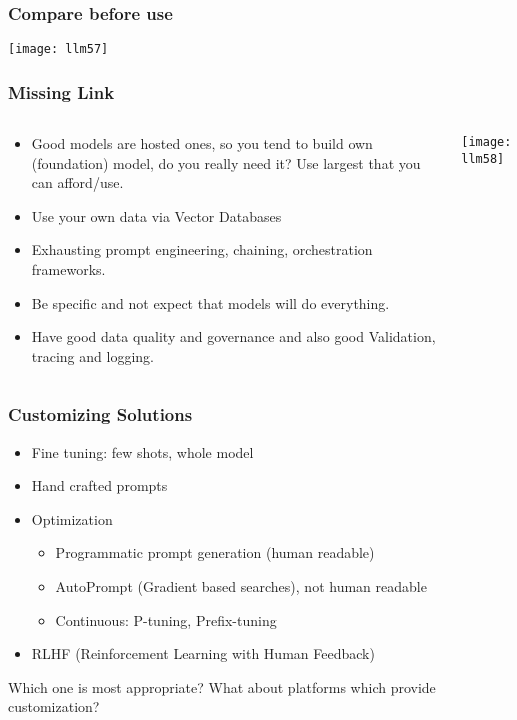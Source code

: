 \begin{frame}[fragile]\frametitle{Compare before use}

\begin{center}
\texttt{[image: llm57]}
\end{center}
\end{frame}

\begin{frame}[fragile]\frametitle{Missing Link}
\begin{columns}
    \begin{column}[T]{0.5\linewidth}
		\begin{itemize}
		\item Good models are hosted ones, so you tend to build own (foundation) model, do you really need it? Use largest that you can afford/use.
		\item Use your own data via Vector Databases
		\item Exhausting prompt engineering, chaining, orchestration frameworks.
		\item Be specific and not expect that models will do everything.
		\item Have good data quality and governance and also good Validation, tracing and logging.
		\end{itemize}	
    \end{column}
    \begin{column}[T]{0.5\linewidth}
		\begin{center}
			\texttt{[image: llm58]}
		\end{center}
	\end{column}
  \end{columns}
\end{frame}


\begin{frame}[fragile]\frametitle{Customizing Solutions}

\begin{itemize}
\item Fine tuning: few shots, whole model
\item Hand crafted prompts
\item Optimization
	\begin{itemize}
	\item Programmatic prompt generation (human readable)
	\item AutoPrompt (Gradient based searches), not human readable
	\item Continuous: P-tuning, Prefix-tuning
	\end{itemize}
\item RLHF (Reinforcement Learning with Human Feedback)
\end{itemize}	

Which one is most appropriate? What about platforms which provide customization?
\end{frame}


